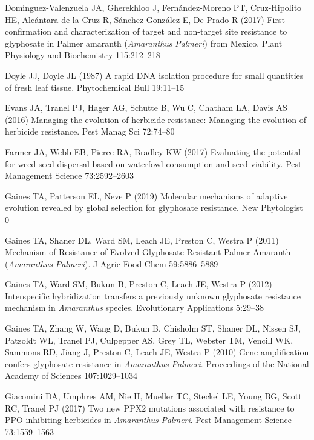\documentclass[
  12pt,
  a4paper]{article}
\begin{document}
\leavevmode\hypertarget{ref-dominguez-valenzuela_first_2017}{}%
Dominguez-Valenzuela JA, Gherekhloo J, Fernández-Moreno PT,
Cruz-Hipolito HE, Alcántara-de la Cruz R, Sánchez-González E, De Prado R
(2017) First confirmation and characterization of target and non-target
site resistance to glyphosate in Palmer amaranth (\emph{Amaranthus}
\emph{Palmeri}) from Mexico. Plant Physiology and Biochemistry
115:212--218

\leavevmode\hypertarget{ref-doyle_rapid_1987}{}%
Doyle JJ, Doyle JL (1987) A rapid DNA isolation procedure for small
quantities of fresh leaf tissue. Phytochemical Bull 19:11--15

\leavevmode\hypertarget{ref-evans_managing_2016}{}%
Evans JA, Tranel PJ, Hager AG, Schutte B, Wu C, Chatham LA, Davis AS
(2016) Managing the evolution of herbicide resistance: Managing the
evolution of herbicide resistance. Pest Manag Sci 72:74--80

\leavevmode\hypertarget{ref-farmer_evaluating_2017}{}%
Farmer JA, Webb EB, Pierce RA, Bradley KW (2017) Evaluating the
potential for weed seed dispersal based on waterfowl consumption and
seed viability. Pest Management Science 73:2592--2603

\leavevmode\hypertarget{ref-gaines_molecular_2019}{}%
Gaines TA, Patterson EL, Neve P (2019) Molecular mechanisms of adaptive
evolution revealed by global selection for glyphosate resistance. New
Phytologist 0

\leavevmode\hypertarget{ref-gaines_mechanism_2011}{}%
Gaines TA, Shaner DL, Ward SM, Leach JE, Preston C, Westra P (2011)
Mechanism of Resistance of Evolved Glyphosate-Resistant Palmer Amaranth
(\emph{Amaranthus} \emph{Palmeri}). J Agric Food Chem 59:5886--5889

\leavevmode\hypertarget{ref-gaines_interspecific_2012}{}%
Gaines TA, Ward SM, Bukun B, Preston C, Leach JE, Westra P (2012)
Interspecific hybridization transfers a previously unknown glyphosate
resistance mechanism in \emph{Amaranthus} species. Evolutionary
Applications 5:29--38

\leavevmode\hypertarget{ref-gaines_gene_2010}{}%
Gaines TA, Zhang W, Wang D, Bukun B, Chisholm ST, Shaner DL, Nissen SJ,
Patzoldt WL, Tranel PJ, Culpepper AS, Grey TL, Webster TM, Vencill WK,
Sammons RD, Jiang J, Preston C, Leach JE, Westra P (2010) Gene
amplification confers glyphosate resistance in \emph{Amaranthus}
\emph{Palmeri}. Proceedings of the National Academy of Sciences
107:1029--1034

\leavevmode\hypertarget{ref-giacomini_two_2017-1}{}%
Giacomini DA, Umphres AM, Nie H, Mueller TC, Steckel LE, Young BG, Scott
RC, Tranel PJ (2017) Two new PPX2 mutations associated with resistance
to PPO-inhibiting herbicides in \emph{Amaranthus} \emph{Palmeri}. Pest
Management Science 73:1559--1563
\end{document}
